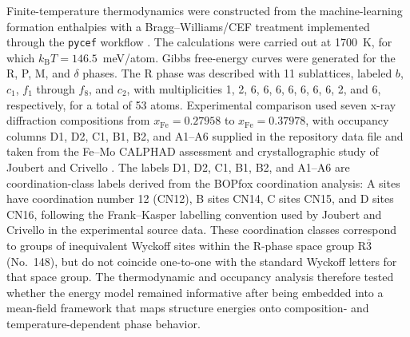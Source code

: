 \documentclass[prb,twocolumn,floatfix]{revtex4-2}
\begin{document}
Finite-temperature thermodynamics were constructed from the machine-learning formation enthalpies with a Bragg--Williams/CEF treatment implemented through the \texttt{pycef} workflow \cite{Hillert2001CEF,Fries1998BWG}. The calculations were carried out at 1700~K, for which $k_{\mathrm{B}}T=146.5$~meV/atom. Gibbs free-energy curves were generated for the R, P, M, and $\delta$ phases. The R phase was described with 11 sublattices, labeled $b$, $c_{1}$, $f_{1}$ through $f_{8}$, and $c_{2}$, with multiplicities 1, 2, 6, 6, 6, 6, 6, 6, 6, 2, and 6, respectively, for a total of 53 atoms. Experimental comparison used seven x-ray diffraction compositions from $x_{\mathrm{Fe}}=0.27958$ to $x_{\mathrm{Fe}}=0.37978$, with occupancy columns D1, D2, C1, B1, B2, and A1--A6 supplied in the repository data file and taken from the Fe--Mo CALPHAD assessment and crystallographic study of Joubert and Crivello \cite{JoubertCrivello2012}. The labels D1, D2, C1, B1, B2, and A1--A6 are coordination-class labels derived from the BOPfox coordination analysis: A sites have coordination number 12 (CN12), B sites CN14, C sites CN15, and D sites CN16, following the Frank--Kasper labelling convention used by Joubert and Crivello in the experimental source data. These coordination classes correspond to groups of inequivalent Wyckoff sites within the R-phase space group R$\bar{3}$ (No.~148), but do not coincide one-to-one with the standard Wyckoff letters for that space group. The thermodynamic and occupancy analysis therefore tested whether the energy model remained informative after being embedded into a mean-field framework that maps structure energies onto composition- and temperature-dependent phase behavior.
\end{document}
